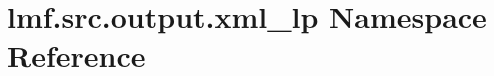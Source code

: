 \hypertarget{namespacelmf_1_1src_1_1output_1_1xml__lp}{\section{lmf.\+src.\+output.\+xml\+\_\+lp Namespace Reference}
\label{namespacelmf_1_1src_1_1output_1_1xml__lp}
}
